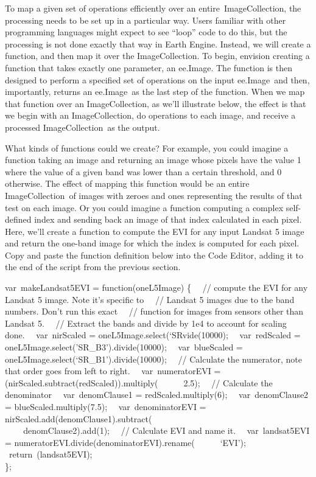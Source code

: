 \documentclass[
  letterpaper,
  DIV=11,
  numbers=noendperiod]{scrreprt}
\begin{document}
To map a given set of operations efficiently over an
entire~ImageCollection, the processing needs to be set up in a
particular way. Users familiar with other programming languages might
expect to see ``loop'' code to do this, but the processing is not done
exactly that way in Earth Engine. Instead, we will create a function,
and then map it over the ImageCollection. To begin, envision creating a
function that takes exactly one parameter, an ee.Image. The function is
then designed to perform a specified set of operations on the input
ee.Image~and then, importantly, returns an ee.Image~as the last step of
the function. When we map that function over an ImageCollection, as
we'll illustrate below, the effect is that we begin with an
ImageCollection, do operations to each image, and receive a processed
ImageCollection~as the output.

What kinds of functions could we create? For example, you could imagine
a function taking an image and returning an image whose pixels have the
value 1 where the value of a given band was lower than a certain
threshold, and 0 otherwise. The effect of mapping this function would be
an entire ImageCollection~of images with zeroes and ones representing
the results of that test on each image. Or you could imagine a function
computing a complex self-defined index and sending back an image of that
index calculated in each pixel. Here, we'll create a function to compute
the EVI for any input Landsat 5 image and return the one-band image for
which the index is computed for each pixel. Copy and paste the function
definition below into the Code Editor, adding it to the end of the
script from the previous section.

var~makeLandsat5EVI = function(oneL5Image) \{~ ~// compute the EVI for
any Landsat 5 image. Note it's specific to~ ~// Landsat 5 images due to
the band numbers. Don't run this exact~ ~// function for images from
sensors other than Landsat 5.~ ~// Extract the bands and divide by 1e4
to account for scaling done.~ ~var~nirScaled =
oneL5Image.select(`SRvide(10000);~ ~var~redScaled =
oneL5Image.select('SR\_B3').divide(10000);~ ~var~blueScaled =
oneL5Image.select(`SR\_B1').divide(10000);~ ~// Calculate the numerator,
note that order goes from left to right.~ ~var~numeratorEVI =
(nirScaled.subtract(redScaled)).multiply(~ ~ ~ ~2.5);~ ~// Calculate the
denominator~ ~var~denomClause1 = redScaled.multiply(6);~
~var~denomClause2 = blueScaled.multiply(7.5);~ ~var~denominatorEVI =
nirScaled.add(denomClause1).subtract(\\
\hspace*{0.333em} ~ ~ ~denomClause2).add(1);~ ~// Calculate EVI and name
it.~ ~var~landsat5EVI = numeratorEVI.divide(denominatorEVI).rename(~ ~ ~
~`EVI');~ ~return~(landsat5EVI);\\
\};
\end{document}

